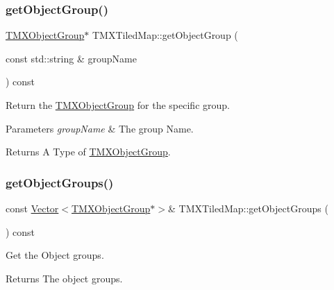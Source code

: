 \subsubsection{\texorpdfstring{get\+Object\+Group()}{getObjectGroup()}\hspace{0.1cm}{\footnotesize\ttfamily [2/2]}}
{\footnotesize\ttfamily \hyperlink{classTMXObjectGroup}{T\+M\+X\+Object\+Group}$\ast$ T\+M\+X\+Tiled\+Map\+::get\+Object\+Group (\begin{DoxyParamCaption}\item[{const std\+::string \&}]{group\+Name }\end{DoxyParamCaption}) const}

Return the \hyperlink{classTMXObjectGroup}{T\+M\+X\+Object\+Group} for the specific group.


\begin{DoxyParams}{Parameters}
{\em group\+Name} & The group Name. \\
\hline
\end{DoxyParams}
\begin{DoxyReturn}{Returns}
A Type of \hyperlink{classTMXObjectGroup}{T\+M\+X\+Object\+Group}. 
\end{DoxyReturn}
\mbox{\label{classTMXTiledMap_aaa618a376bbd5d2cf8e1c2ca6a7b8e53}} 
\subsubsection{\texorpdfstring{get\+Object\+Groups()}{getObjectGroups()}\hspace{0.1cm}{\footnotesize\ttfamily [1/2]}}
{\footnotesize\ttfamily const \hyperlink{classVector}{Vector}$<$\hyperlink{classTMXObjectGroup}{T\+M\+X\+Object\+Group}$\ast$$>$\& T\+M\+X\+Tiled\+Map\+::get\+Object\+Groups (\begin{DoxyParamCaption}{ }\end{DoxyParamCaption}) const\hspace{0.3cm}{\ttfamily [inline]}}

Get the Object groups.

\begin{DoxyReturn}{Returns}
The object groups. 
\end{DoxyReturn}
\mbox{\label{classTMXTiledMap_aaa618a376bbd5d2cf8e1c2ca6a7b8e53}} 
